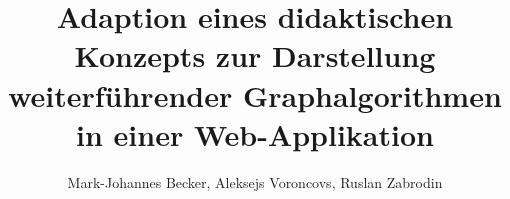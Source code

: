 \documentclass{article}
\begin{document}
\title{Adaption eines didaktischen Konzepts zur Darstellung weiterf\"uhrender Graphalgorithmen in einer Web-Applikation}

\author{Mark-Johannes Becker, Aleksejs Voroncovs, Ruslan Zabrodin}

\maketitle
\end{document}
